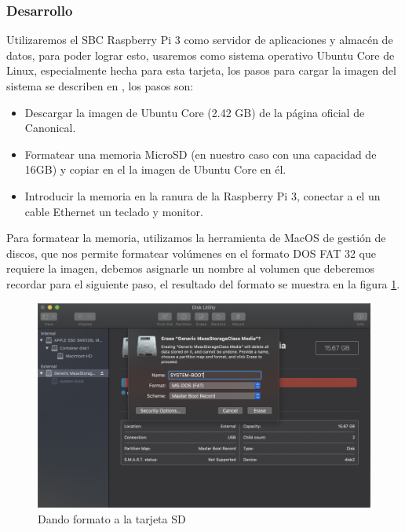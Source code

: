 \subsubsection{Desarrollo}

Utilizaremos el SBC Raspberry Pi 3 \citep{MarcoTeorico19} como servidor de aplicaciones y almacén de datos, para poder lograr esto, usaremos como sistema operativo Ubuntu Core de Linux, especialmente hecha para esta tarjeta, los pasos para cargar la imagen del sistema se describen en \citep{InstallUbuntuCore}, los pasos son:

\begin{itemize}
    \item Descargar la imagen de Ubuntu Core (2.42 GB) de la página oficial de Canonical.
    \item Formatear una memoria MicroSD (en nuestro caso con una capacidad de 16GB) y copiar en el la imagen de Ubuntu Core en él.
    \item Introducir la memoria en la ranura de la Raspberry Pi 3, conectar a el un cable Ethernet un teclado y monitor.
\end{itemize}

Para formatear la memoria, utilizamos la herramienta de MacOS de gestión de discos, que nos permite formatear volúmenes en el formato DOS FAT 32 que requiere la imagen, debemos asignarle un nombre al volumen que deberemos recordar para el siguiente paso, el resultado del formato se muestra en la figura \ref{fig:formato}.
 
\begin{figure}[H]
	\centering
	\includegraphics[scale=.3]{Capitulo5/images/format.png}
	\caption{Dando formato a la tarjeta SD}
	\label{fig:formato}
\end{figure} 

